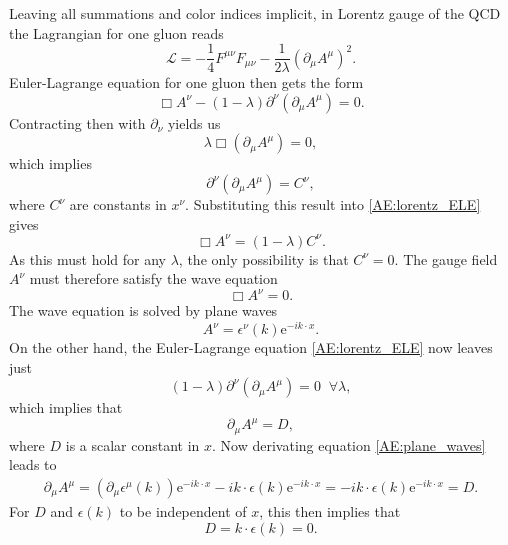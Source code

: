 \documentclass[a4paper, twoside, english, 12pt]{article}
\begin{document}
Leaving all summations and color indices implicit, in Lorentz gauge of the QCD the Lagrangian for one gluon reads
\begin{equation}
\mathcal{L} = - \frac{1}{4}F^{\mu\nu}F_{\mu\nu} - \frac{1}{2\lambda}(\partial_\mu A^\mu)^2.
\end{equation}
Euler-Lagrange equation for one gluon then gets the form
\begin{equation}\label{AE:lorentz_ELE}
\Box A^\nu -(1-\lambda)\partial^\nu\left(\partial_\mu A^\mu\right)= 0.
\end{equation}
Contracting then with $\partial_\nu$ yields us
\begin{equation}
	\lambda\Box\left(\partial_\mu A^\mu\right) = 0,
\end{equation}
which implies
\begin{equation}
\partial^\nu\left(\partial_\mu A^\mu\right) = C^\nu,
\end{equation}
where $C^\nu$ are constants in $x^\nu$. Substituting this result into \eqref{AE:lorentz_ELE} gives
\begin{equation}
	\Box A^\nu = (1-\lambda)C^\nu.
\end{equation}
As this must hold for any $\lambda$, the only possibility is that $C^\nu=0$. The gauge field $A^\nu$ must therefore satisfy the wave equation
\begin{equation}
	\Box A^\nu = 0.
\end{equation}
The wave equation is solved by plane waves
\begin{equation}\label{AE:plane_waves}
	A^\nu = \epsilon^\nu(k)\text{e}^{-ik\cdot x}.
\end{equation}
On the other hand, the Euler-Lagrange equation \eqref{AE:lorentz_ELE} now leaves just
\begin{equation}
(1-\lambda)\partial^\nu\left(\partial_\mu A^\mu\right)= 0 \; \; \forall \lambda,
\end{equation}
which implies that
\begin{equation}
	\partial_\mu A^\mu = D,
\end{equation}
where $D$ is a scalar constant in $x$. Now derivating equation \eqref{AE:plane_waves} leads to
\begin{align}
	\partial_\mu A^\mu = \left(\partial_\mu \epsilon^\mu(k)\right)\text{e}^{-ik\cdot x} -ik\cdot \epsilon(k)\text{e}^{-ik\cdot x} = -ik\cdot \epsilon(k)\text{e}^{-ik\cdot x} = D.
\end{align}
For $D$ and $\epsilon(k)$ to be independent of $x$, this then implies that
\begin{equation}\label{AE:pol_k}
	D = k\cdot \epsilon(k) = 0.
\end{equation}
\end{document}
